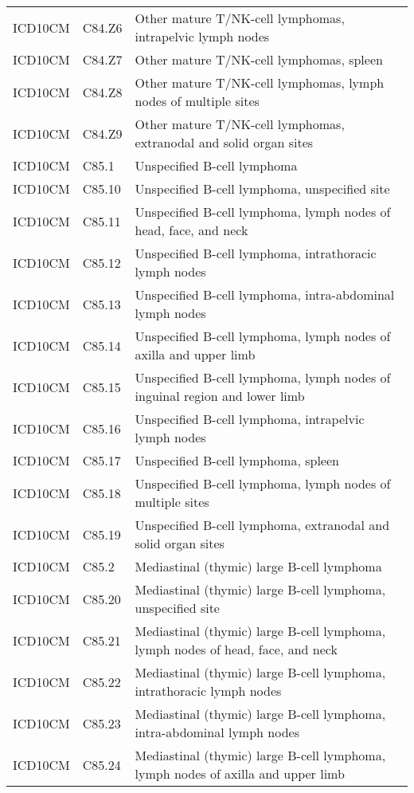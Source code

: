 \begin{table}[ht]
\begin{tabular}{lll}
  ICD10CM & C84.Z6 & Other mature T/NK-cell lymphomas, intrapelvic lymph nodes \\ 
  ICD10CM & C84.Z7 & Other mature T/NK-cell lymphomas, spleen \\ 
  ICD10CM & C84.Z8 & Other mature T/NK-cell lymphomas, lymph nodes of multiple sites \\ 
  ICD10CM & C84.Z9 & Other mature T/NK-cell lymphomas, extranodal and solid organ sites \\ 
  ICD10CM & C85.1 & Unspecified B-cell lymphoma \\ 
  ICD10CM & C85.10 & Unspecified B-cell lymphoma, unspecified site \\ 
  ICD10CM & C85.11 & Unspecified B-cell lymphoma, lymph nodes of head, face, and neck \\ 
  ICD10CM & C85.12 & Unspecified B-cell lymphoma, intrathoracic lymph nodes \\ 
  ICD10CM & C85.13 & Unspecified B-cell lymphoma, intra-abdominal lymph nodes \\ 
  ICD10CM & C85.14 & Unspecified B-cell lymphoma, lymph nodes of axilla and upper limb \\ 
  ICD10CM & C85.15 & Unspecified B-cell lymphoma, lymph nodes of inguinal region and lower limb \\ 
  ICD10CM & C85.16 & Unspecified B-cell lymphoma, intrapelvic lymph nodes \\ 
  ICD10CM & C85.17 & Unspecified B-cell lymphoma, spleen \\ 
  ICD10CM & C85.18 & Unspecified B-cell lymphoma, lymph nodes of multiple sites \\ 
  ICD10CM & C85.19 & Unspecified B-cell lymphoma, extranodal and solid organ sites \\ 
  ICD10CM & C85.2 & Mediastinal (thymic) large B-cell lymphoma \\ 
  ICD10CM & C85.20 & Mediastinal (thymic) large B-cell lymphoma, unspecified site \\ 
  ICD10CM & C85.21 & Mediastinal (thymic) large B-cell lymphoma, lymph nodes of head, face, and neck \\ 
  ICD10CM & C85.22 & Mediastinal (thymic) large B-cell lymphoma, intrathoracic lymph nodes \\ 
  ICD10CM & C85.23 & Mediastinal (thymic) large B-cell lymphoma, intra-abdominal lymph nodes \\ 
  ICD10CM & C85.24 & Mediastinal (thymic) large B-cell lymphoma, lymph nodes of axilla and upper limb \\ 

\end{tabular}
\end{table}
